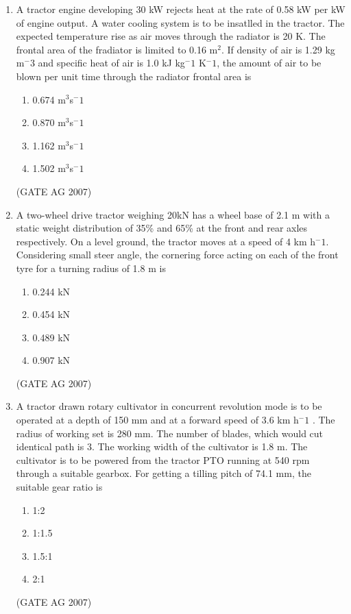 \documentclass[journal,12pt,onecolumn]{IEEEtran}
\theoremstyle{remark}
\begin{document}
\begin{enumerate}
\item  A tractor engine developing 30 kW rejects heat at the rate of 0.58 kW per kW of engine output. A water cooling system is to be insatlled in the tractor. The expected temperature rise as air moves through the radiator is 20 K. The frontal area of the fradiator is limited to 0.16 m$^2$. If density of air is 1.29 kg m$^-3$ and specific heat of air is 1.0 kJ kg$^-1$ K$^-1$, the amount of air to be blown per unit time through the radiator frontal area is 
\begin{multicols}{4}
\begin{enumerate}
    \item  0.674 m$^3$s$^-1$
    \item  0.870 m$^3$s$^-1$
    \item  1.162 m$^3$s$^-1$
    \item  1.502 m$^3$s$^-1$
\end{enumerate}
\end{multicols}
\hfill(GATE AG 2007)

\item  A two-wheel drive tractor weighing 20kN has a wheel base of 2.1 m with a static weight distribution of 35\% and 65\% at the front and rear axles respectively. On a level ground, the tractor moves at a speed of 4 km h$^-1$. Considering small steer angle, the cornering force acting on each of the front tyre for a turning radius of 1.8 m is
\begin{multicols}{4}
    \begin{enumerate}
        \item 0.244 kN
        \item 0.454 kN
        \item 0.489 kN
        \item 0.907 kN
    \end{enumerate}
\end{multicols}
\hfill(GATE AG 2007)

\item
 A tractor drawn rotary cultivator in concurrent revolution mode is to be operated at a depth of 150 mm and at a forward speed of 3.6 km h$^-1$ . The radius of working set is 280 mm. The number of blades, which would cut identical path is 3. The working width of the cultivator is 1.8 m. The cultivator is to be powered from the tractor PTO running at 540 rpm through a suitable gearbox. For getting a tilling pitch of 74.1 mm, the suitable gear ratio is 
\begin{multicols}{4}
\begin{enumerate}
    \item 1:2
    \item 1:1.5
    \item 1.5:1
    \item 2:1
\end{enumerate}
\end{multicols}
\hfill(GATE AG 2007)


\end{enumerate}
\end{document}

